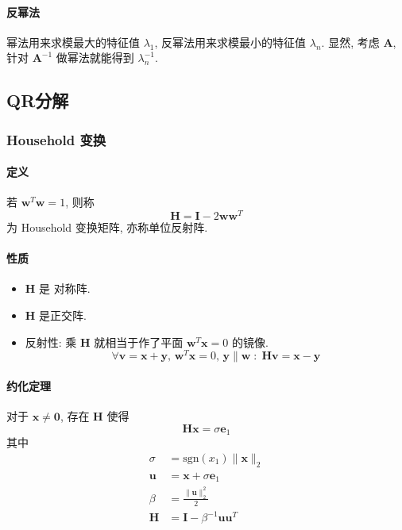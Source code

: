 \documentclass{ctexart}
\newcommand{\sgn}{\mathrm{sgn}}
\begin{document}
\paragraph{反幂法}
    幂法用来求模最大的特征值 $\lambda_1$, 反幂法用来求模最小的特征值 $\lambda_n$.
    显然, 考虑 $\mathbf{A}$, 针对 $ \mathbf{A}^{-1}$ 做幂法就能得到 $\lambda_n^{-1}$.\par

\subsection{QR分解}
\subsubsection{Household 变换}
\paragraph{定义}
    若 $ \mathbf{w}^T \mathbf{w} = 1$, 则称 \[
        \mathbf{H} = \mathbf{I} - 2 \mathbf{w} \mathbf{w}^T\]
    为 Household 变换矩阵, 亦称单位反射阵.
\paragraph{性质}
    \begin{itemize}
        \item $\mathbf{H} $ 是 对称阵.
        \item $\mathbf{H} $ 是正交阵.
        \item 反射性: 乘 $\mathbf{H}$ 就相当于作了平面 $\mathbf{w}^T \mathbf{x} = 0$ 的镜像.\[
            \forall \mathbf{v} = \mathbf{x} + \mathbf{y},\,\mathbf{w}^T \mathbf{x} = 0,\, \mathbf{y} \parallel \mathbf{w}\;:\;
            \mathbf{H} \mathbf{v} = \mathbf{x} - \mathbf{y} \]
    \end{itemize}
\paragraph{约化定理}
    对于 $\mathbf{x} \neq \mathbf{0} $, 存在 $ \mathbf{H}$ 使得 \[
        \mathbf{H} \mathbf{x} = \sigma \mathbf{e}_1\]
    其中 \begin{align*}
        \sigma &= \sgn (x_1) \|\mathbf{x} \|_2\\
        \mathbf{u}& = \mathbf{x} + \sigma \mathbf{e}_1\\
        \beta &= \frac{\|\mathbf{u}\|_2^2}{2}\\
        \mathbf{H} &= \mathbf{I} - \beta^{-1} \mathbf{u} \mathbf{u}^T
    \end{align*}
\end{document}
